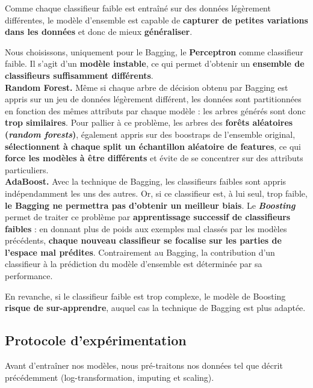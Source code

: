 \documentclass[12pt]{article}
\begin{document}
Comme chaque classifieur faible est entraîné sur des données légèrement
différentes, le modèle d'ensemble est capable de \textbf{capturer de petites
variations dans les données} et donc de mieux \textbf{généraliser}. 

Nous choisissons, uniquement pour le Bagging, le \textbf{Perceptron} comme
classifieur faible. Il s'agit d'un \textbf{modèle instable}, ce qui permet
d'obtenir un \textbf{ensemble de classifieurs suffisamment différents}. \\

\textbf{Random Forest. } \quad Même si chaque arbre de décision obtenu par
Bagging est appris sur un jeu de données légèrement différent, les données sont
partitionnées en fonction des mêmes attributs par chaque modèle : les arbres
générés sont donc \textbf{trop similaires}. Pour pallier à ce problème, les
arbres des \textbf{forêts aléatoires (\emph{random forests})}, également appris
sur des boostraps de l'ensemble original, \textbf{sélectionnent à chaque split
un échantillon aléatoire de features}, ce qui \textbf{force les modèles à être
différents} et évite de se concentrer sur des attributs particuliers. \\

\textbf{AdaBoost. } \quad Avec la technique de Bagging, les classifieurs faibles
sont appris indépendamment les uns des autres. Or, si ce classifieur est, à lui
seul, trop faible, \textbf{le Bagging ne permettra pas d'obtenir un meilleur
biais}. Le \textbf{\emph{Boosting}} permet de traiter ce problème par
\textbf{apprentissage successif de classifieurs faibles} : en donnant plus de
poids aux exemples mal classés par les modèles précédents, \textbf{chaque nouveau
classifieur se focalise sur les parties de l'espace mal prédites}. Contrairement
au Bagging, la contribution d'un classifieur à la prédiction du modèle
d'ensemble est déterminée par sa performance.

En revanche, si le classifieur faible est trop complexe, le modèle de Boosting
\textbf{risque de sur-apprendre}, auquel cas la technique de Bagging est plus
adaptée.\\

\subsection{Protocole d'expérimentation}

Avant d'entraîner nos modèles, nous pré-traitons nos données tel que décrit
précédemment (log-transformation, imputing et scaling). \\
\end{document}
